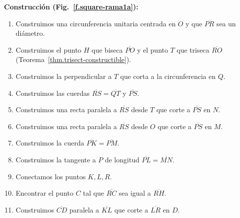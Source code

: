 \textbf{Construcción (Fig.~\ref{f.square-rama1a}):}
\begin{enumerate}

\item Construimos una circunferencia unitaria centrada en $O$ y que $\overline{PR}$ sea un diámetro.

\item Construimos el punto $H$ que biseca $\overline{PO}$ y el punto $T$ que triseca $\overline{RO}$ (Teorema~\ref{thm.trisect-constructible}).

\item Construimos la perpendicular a $T$ que corta a la circunferencia en $Q$.

\item Construimos las cuerdas $\overline{RS}=\overline{QT}$ y $\overline{PS}$.

\item Construimos una recta paralela a $\overline{RS}$ desde $T$ que corte a $\overline{PS}$ en $N$.

\item Construimos una recta paralela a $\overline{RS}$ desde $O$ que corte a $\overline{PS}$ en $M$.

\item Construimos la cuerda $\overline{PK}=\overline{PM}$.

\item Construimos la tangente a $P$ de longitud $\overline{PL}=\overline{MN}$.

\item Conectamos los puntos $K,L,R$.

\item Encontrar el punto $C$ tal que $\overline{RC}$ sea igual a $\overline{RH}$.

\item Construimos $\overline{CD}$ paralela a $\overline{KL}$ que corte a $\overline{LR}$ en $D$. 
\end{enumerate}

